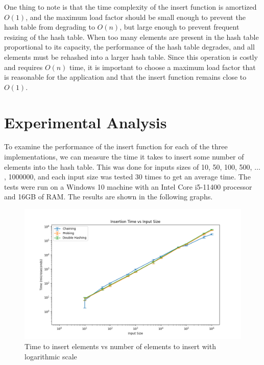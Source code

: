 \documentclass{article}
\begin{document}
One thing to note is that the time complexity of the insert function is amortized $O(1)$, and the maximum load factor should be small enough to prevent the hash table from degrading to $O(n)$, but large enough to prevent frequent resizing of the hash table.
When too many elements are present in the hash table proportional to its capacity, the performance of the hash table degrades, and all elements must be rehashed into a larger hash table.
Since this operation is costly and requires $O(n)$ time, it is important to choose a maximum load factor that is reasonable for the application and that the insert function remains close to $O(1)$.

\section{Experimental Analysis}
To examine the performance of the insert function for each of the three implementations, we can measure the time it takes to insert some number of elements into the hash table.
This was done for inputs sizes of 10, 50, 100, 500, $\ldots$, 1000000, and each input size was tested 30 times to get an average time.
The tests were run on a Windows 10 machine with an Intel Core i5-11400 processor and 16GB of RAM.
The results are shown in the following graphs.

\begin{figure}[H]
    \centering
    \includegraphics[width=\textwidth]{../plotting/plot_log.png}
    \caption{Time to insert elements vs number of elements to insert with logarithmic scale}
\end{figure}
\end{document}
